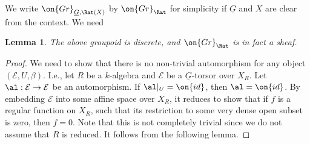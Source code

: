 \documentclass[]{pcmi}
\theoremstyle{plain}
\newtheorem{lem}[equation]{Lemma}
\theoremstyle{remark}
\theoremstyle{definition}
\newcommand{\mE}{{\mathcal E}}
\newcommand{\Gr}{{\on{Gr}}}
\newcommand{\id}{{\on{id}}}
\begin{document}
We write $\Gr_{\underline G,\Rat(X)}$ by $\Gr_{\Rat}$ for simplicity if $\underline G$ and $X$ are clear from the context. We need 
\begin{lem}\label{rat sheaf}
The above groupoid is discrete, and $\Gr_{\Rat}$ is in fact a sheaf.
\end{lem}
\begin{proof}We need to show that there is no non-trivial automorphism for any object $(\mE,U,\beta)$. I.e., let $R$ be a $k$-algebra and $\mE$ be a $\underline G$-torsor over $X_R$. Let $\al: \mE\to \mE$ be an automorphism. If $\al|_U=\id$, then $\al=\id$. By embedding $\mE$ into some affine space over $X_R$, it reduces to show that if $f$ is a regular function on $X_R$, such that its restriction to some very dense open subset is zero, then $f=0$. Note that this is not completely trivial since we do not assume that $R$ is reduced. It follows from the following lemma. 
\end{proof}
\end{document}
